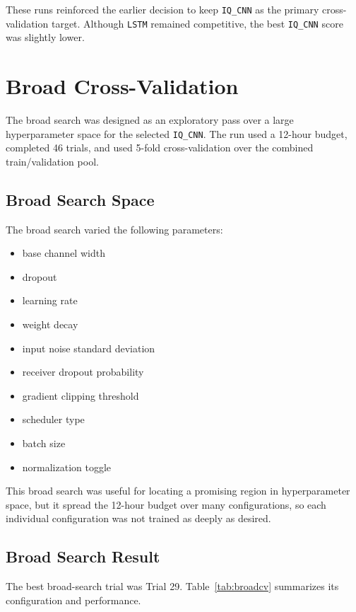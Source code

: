\documentclass[11pt]{article}
\begin{document}
These runs reinforced the earlier decision to keep \texttt{IQ\_CNN} as the primary cross-validation target. Although \texttt{LSTM} remained competitive, the best \texttt{IQ\_CNN} score was slightly lower.

\section{Broad Cross-Validation}
The broad search was designed as an exploratory pass over a large hyperparameter space for the selected \texttt{IQ\_CNN}. The run used a 12-hour budget, completed 46 trials, and used 5-fold cross-validation over the combined train/validation pool.

\subsection{Broad Search Space}
The broad search varied the following parameters:
\begin{itemize}
    \item base channel width
    \item dropout
    \item learning rate
    \item weight decay
    \item input noise standard deviation
    \item receiver dropout probability
    \item gradient clipping threshold
    \item scheduler type
    \item batch size
    \item normalization toggle
\end{itemize}

This broad search was useful for locating a promising region in hyperparameter space, but it spread the 12-hour budget over many configurations, so each individual configuration was not trained as deeply as desired.

\subsection{Broad Search Result}
The best broad-search trial was Trial 29. Table~\ref{tab:broadcv} summarizes its configuration and performance.
\end{document}
